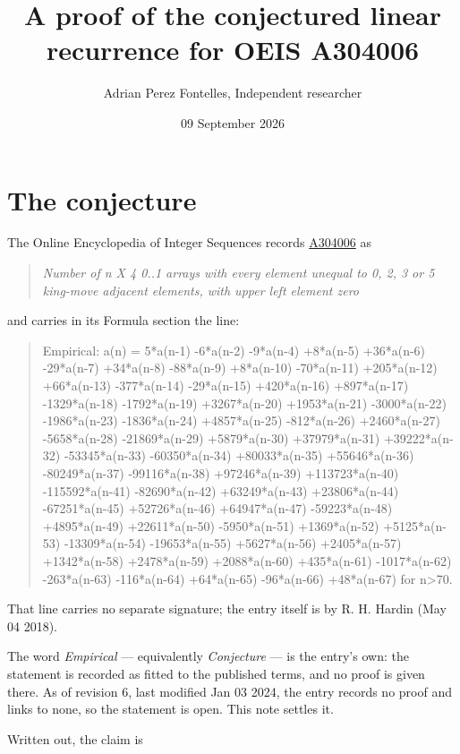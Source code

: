 \documentclass[11pt]{article}
\title{A proof of the conjectured linear recurrence for OEIS A304006}
\author{Adrian Perez Fontelles, Independent researcher}
\date{09 September 2026}
\theoremstyle{definition}
\begin{document}
\maketitle
\section{The conjecture}

The Online Encyclopedia of Integer Sequences records \href{https://oeis.org/A304006}{A304006} as

\begin{quote}\itshape Number of n X 4 0..1 arrays with every element unequal to 0, 2, 3 or 5 king-move adjacent elements, with upper left element zero\end{quote}

and carries in its Formula section the line:

\begin{quote}\ttfamily Empirical: a(n) = 5*a(n-1) -6*a(n-2) -9*a(n-4) +8*a(n-5) +36*a(n-6) -29*a(n-7) +34*a(n-8) -88*a(n-9) +8*a(n-10) -70*a(n-11) +205*a(n-12) +66*a(n-13) -377*a(n-14) -29*a(n-15) +420*a(n-16) +897*a(n-17) -1329*a(n-18) -1792*a(n-19) +3267*a(n-20) +1953*a(n-21) -3000*a(n-22) -1986*a(n-23) -1836*a(n-24) +4857*a(n-25) -812*a(n-26) +2460*a(n-27) -5658*a(n-28) -21869*a(n-29) +5879*a(n-30) +37979*a(n-31) +39222*a(n-32) -53345*a(n-33) -60350*a(n-34) +80033*a(n-35) +55646*a(n-36) -80249*a(n-37) -99116*a(n-38) +97246*a(n-39) +113723*a(n-40) -115592*a(n-41) -82690*a(n-42) +63249*a(n-43) +23806*a(n-44) -67251*a(n-45) +52726*a(n-46) +64947*a(n-47) -59223*a(n-48) +4895*a(n-49) +22611*a(n-50) -5950*a(n-51) +1369*a(n-52) +5125*a(n-53) -13309*a(n-54) -19653*a(n-55) +5627*a(n-56) +2405*a(n-57) +1342*a(n-58) +2478*a(n-59) +2088*a(n-60) +435*a(n-61) -1017*a(n-62) -263*a(n-63) -116*a(n-64) +64*a(n-65) -96*a(n-66) +48*a(n-67) for n>70.\end{quote}

That line carries no separate signature; the entry itself is by R. H. Hardin (May 04 2018).

The word {\itshape Empirical} --- equivalently {\itshape Conjecture} --- is the entry's own: the statement is recorded as fitted to the published terms, and no proof is given there. As of revision 6, last modified Jan 03 2024, the entry records no proof and links to none, so the statement is open. This note settles it.

Written out, the claim is
\end{document}

